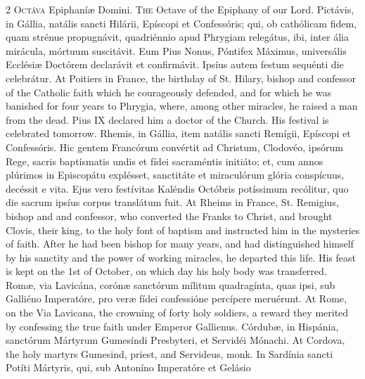 \begin{paracol}{2}
\lettrine[lines=1]{O}{ctáva} Epiphaníæ Domini.
\switchcolumn
{}
\lettrine[lines=1]{T}{he} Octave of the Epiphany of our Lord.
\switchcolumn*
{}
Pictávis, in Gállia, natális sancti Hilárii, Epíscopi et Confessóris; qui, 
 ob cathólicam fidem, quam strénue propugnávit, quadriénnio apud Phrygiam 
 relegátus, ibi, inter ália mirácula, mórtuum suscitávit. Eum Pius 
 Nonus, Póntifex Máximus, universális Ecclésiæ 
 Doctórem declarávit et confirmávit. Ipsíus autem festum sequénti die 
 celebrátur.
\switchcolumn
{}
At Poitiers in France, the birthday of St. Hilary, bishop and confessor of 
 the Catholic faith which he courageously defended, and for which he was 
 banished for four years to Phrygia, where, among other miracles, he raised a 
 man from the dead. Pius IX declared him a doctor of the Church. 
 His festival is celebrated tomorrow.
\switchcolumn*
{}
Rhemis, in Gállia, item natális sancti Remígii, Epíscopi et Confessóris. 
 Hic gentem Francórum convértit ad Christum, Clodovéo, 
 ipsórum Rege, sacris baptísmatis undis et fídei sacraméntis initiáto; et, 
 cum annos plúrimos in Episcopátu explésset, sanctitáte et miraculórum glória 
 conspícuus, decéssit e vita. Ejus vero festívitas Kaléndis Octóbris 
 potíssimum recólitur, quo die sacrum ipsíus corpus translátum fuit.
\switchcolumn
{}
At Rheims in France, St. Remigius, bishop and and confessor, who converted 
 the Franks to Christ, and brought Clovis, their king, to the holy font of 
 baptism and instructed him in the mysteries of faith. After he had 
 been bishop for many years, and had distinguished himself by his sanctity 
 and the power of working miracles, he departed this life. His feast is 
 kept on the 1st of October, on which day his holy body was transferred.
\switchcolumn*
{}
Romæ, via Lavicána, corónæ sanctórum mílitum 
 quadragínta, quas ipsi, sub Galliéno Imperatóre, pro veræ fídei confessióne 
 percípere meruérunt.
\switchcolumn
{}
At Rome, on the Via Lavicana, the crowning of forty holy soldiers, a reward 
 they merited by confessing the true faith under Emperor Gallienus.
\switchcolumn*
{}
Córdubæ, in Hispánia, sanctórum Mártyrum 
 Gumesíndi Presbyteri, et Servidéi Mónachi.
\switchcolumn
{}
At Cordova, the holy martyrs Gumesind, priest, and Servideus, monk.
\switchcolumn*
{}
In Sardínia sancti Potíti Mártyris, qui, sub Antoníno Imperatóre et Gelásio 

\end{paracol}
